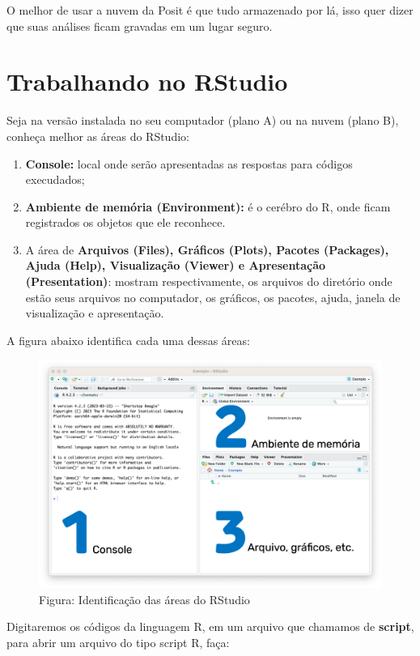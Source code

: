 \documentclass[
]{book}
\begin{document}
O melhor de usar a nuvem da Posit é que tudo armazenado por lá, isso quer dizer que suas análises ficam gravadas em um lugar seguro.

\chapter{Trabalhando no RStudio}\label{trabalhando-RStudio}

Seja na versão instalada no seu computador (plano A) ou na nuvem (plano B), conheça melhor as áreas do RStudio:

\begin{enumerate}
\def\labelenumi{\arabic{enumi}.}
\item
  \textbf{Console:} local onde serão apresentadas as respostas para códigos execudados;
\item
  \textbf{Ambiente de memória (Environment):} é o cerébro do R, onde ficam registrados os objetos que ele reconhece.
\item
  A área de \textbf{Arquivos (Files), Gráficos (Plots), Pacotes (Packages), Ajuda (Help), Visualização (Viewer) e Apresentação (Presentation)}: mostram respectivamente, os arquivos do diretório onde estão seus arquivos no computador, os gráficos, os pacotes, ajuda, janela de visualização e apresentação.
\end{enumerate}

A figura abaixo identifica cada uma dessas áreas:

\begin{figure}
\centering
\includegraphics{telaRStudio123.png}
\caption{Figura: Identificação das áreas do RStudio}
\end{figure}

Digitaremos os códigos da linguagem R, em um arquivo que chamamos de \textbf{script}, para abrir um arquivo do tipo script R, faça:
\end{document}
